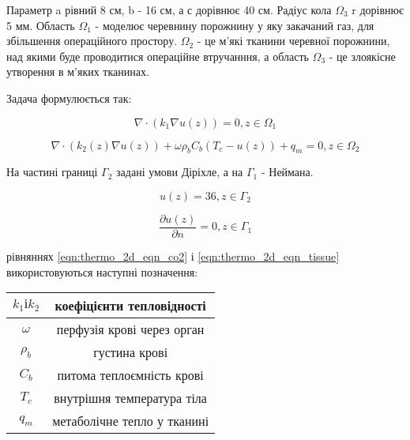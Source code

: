 \noindent Параметр a рівний 8 см, b - 16 см, а с дорівнює 40 см. Радіус кола $\Omega_3$ r дорівнює 5 мм. Область 
$\Omega_1$ - моделює черевнину порожнину у яку закачаний газ, для збільшення операційного простору. $\Omega_2$ - це 
м'які тканини черевної порожнини, над якими буде проводитися операційне втручанння, а область $\Omega_3$ - це злоякісне
утворення в м'яких тканинах.

\noindent Задача формулюється так:

\begin{equation}
    \label{eqn:thermo_2d_eqn_co2}
    \nabla \cdot (k_1 \nabla u(z)) = 0, z \in \Omega_1
\end{equation}

\begin{equation}
    \label{eqn:thermo_2d_eqn_tissue}
    \nabla \cdot (k_2(z) \nabla u(z)) + \omega \rho_b C_b (T_c - u(z)) + q_m  = 0, z \in \Omega_2
\end{equation}

\noindent На частині границі $\Gamma_2$ задані умови Діріхле, а на $\Gamma_1$ - Неймана.

\begin{equation}
    \label{eqn:thermo_2d_cond_1}
    u(z) = 36, z \in \Gamma_2
\end{equation}

\begin{equation}
    \label{eqn:thermo_2d_cond_2}
    \dfrac{\partial{u(z)}}{\partial{n}} = 0, z \in \Gamma_1
\end{equation}

 рівняннях \ref{eqn:thermo_2d_eqn_co2} і \ref{eqn:thermo_2d_eqn_tissue} використовуються наступні позначення:

\begin{center}
    \begin{tabular}{|c|c|} 
        \hline
            \(k_1 і k_2\)  & коефіцієнти тепловідності \\
        \hline
            \(\omega\) & перфузія крові через орган \\
        \hline
            \(\rho_b\) & густина крові \\
        \hline
            \(C_b\) & питома теплоємність крові \\
        \hline
            \(T_c\) & внутрішня температура тіла \\
        \hline
            \(q_m\) & метаболічне тепло у тканині \\
        \hline
    \end{tabular}
\end{center}

